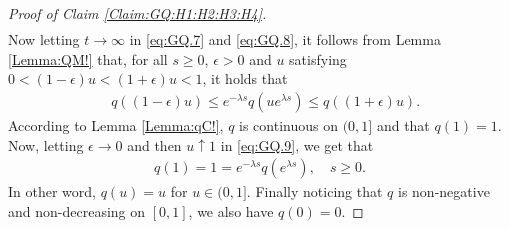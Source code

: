 \documentclass[12pt,a4paper]{amsart}
\numberwithin{equation}{section}
\theoremstyle{plain}
\theoremstyle{definition}
\theoremstyle{remark}
\newcounter{N}
\newcounter{n}[N]
\begin{document}
\begin{proof}[Proof of Claim \ref{Claim:GQ:H1:H2:H3:H4}]
\begin{align}
\end{align}
Now letting $t\to \infty$ in \eqref{eq:GQ.7} and \eqref{eq:GQ.8}, 
it follows from Lemma \ref{Lemma:QM!} that,
for all $s\geq 0$, $\epsilon > 0$ and $u$ satisfying $0 < (1 - \epsilon) u < (1+\epsilon)u < 1$, it holds that
\begin{align}
\label{eq:GQ.9}
& q((1-\epsilon)u)
\leq e^{-\lambda s}q(u e^{\lambda s})
\leq q((1+\epsilon)u).
\end{align}
According to Lemma \ref{Lemma:qC!}, $q$ is continuous on $(0,1]$ and that $q(1)= 1$.
Now, letting $\epsilon \to 0$ and then $u \uparrow 1$ in \eqref{eq:GQ.9}, we get that
\begin{align}
q(1)
=1
= e^{- \lambda s} q(e^{\lambda s}),
\quad s \geq 0.
\end{align}
In other word, $q(u) = u$ for $u\in (0,1]$.
Finally noticing that $q$ is non-negative and non-decreasing on $[0,1]$, we also have $q(0) = 0$.
\end{proof}
\end{document}
